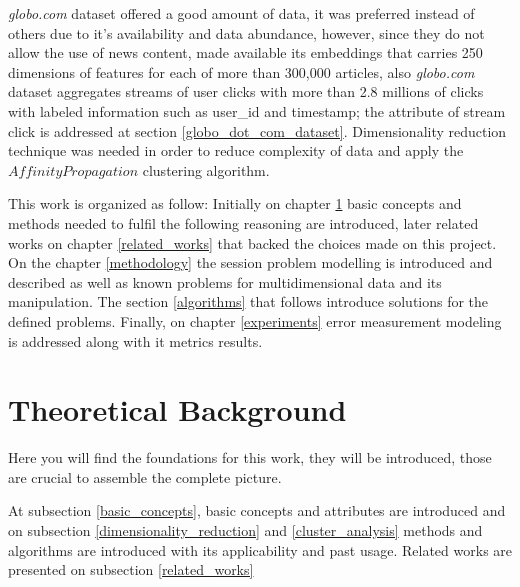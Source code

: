 \documentclass[ecp,tc,english]{iiufrgs}
\begin{document}
\textit{globo.com} dataset offered a good amount of data, it was preferred instead of others due to it's availability and data abundance, however, since they do not allow the use of news content, \cite{moreira2018chameleon} made available its embeddings that carries 250 dimensions of features for each of more than 300,000 articles, also \textit{globo.com} dataset aggregates streams of user clicks with more than 2.8 millions of clicks with labeled information such as user\_id and timestamp; the attribute of stream click is addressed at section \ref{globo_dot_com_dataset}.
Dimensionality reduction technique was needed in order to reduce complexity of data and apply the \(Affinity Propagation\) clustering algorithm. 

This work is organized as follow: Initially on chapter \ref{theoretical_background} basic concepts and methods needed to fulfil the following reasoning are introduced, later related works on chapter \ref{related_works} that backed the choices made on this project. On the chapter \ref{methodology} the session problem modelling is introduced and described as well as known problems for multidimensional data and its manipulation. The section \ref{algorithms} that follows introduce solutions for the defined problems.
Finally, on chapter \ref{experiments} error measurement modeling is addressed along with it metrics results.


\chapter{Theoretical Background} \label{theoretical_background}
Here you will find the foundations for this work, they will be introduced, those are crucial to assemble the complete picture.

At subsection \ref{basic_concepts}, basic concepts and attributes are introduced and on subsection \ref{dimensionality_reduction} and \ref{cluster_analysis} methods and algorithms are introduced with its applicability and past usage. Related works are presented on subsection \ref{related_works}
\end{document}
